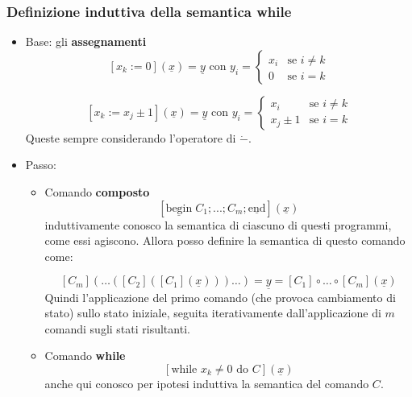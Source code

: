 \documentclass{article}
\begin{document}
\subsubsection{Definizione induttiva della semantica while}
\begin{itemize}
    \item Base: gli \textbf{assegnamenti}
          \[
              [x_k:=0](\underline{x})=\underline{y}\text{ con }y_i=
              \begin{cases}
                  x_i & \text{se }i\neq k \\
                  0   & \text{se }i=k
              \end{cases}
          \]

          \[
              [x_k:=x_j \pm 1](\underline{x})=\underline{y}\text{ con }y_i=
              \begin{cases}
                  x_i       & \text{se } i\neq k \\
                  x_j \pm 1 & \text{se } i=k
              \end{cases}
          \]
Queste sempre considerando l'operatore di $\dot{-}$.
    \item Passo:
          \begin{itemize}
              \item Comando \textbf{composto}
                    $$[\underline{\text{begin}}\;C_1;...;C_m;\underline{\text{end}}](\underline{x})$$
                    induttivamente conosco la semantica di ciascuno di questi programmi, come essi agiscono.
                    Allora posso definire la semantica di questo comando come:

                    $$[C_m](\dots([C_2]([C_1](\underline{x})))\dots)=\underline{y}=[C_1]\circ \dots\circ [C_m](\underline{x})$$
                    Quindi l'applicazione del primo comando (che provoca cambiamento di stato)
                    sullo stato iniziale, seguita iterativamente dall'applicazione di $m$ comandi
                    sugli stati risultanti.

              \item Comando \textbf{while}
                    $$[\text{while }x_k\neq 0 \text{ do }C](\underline{x})$$
                    anche qui conosco per ipotesi induttiva la semantica del comando $C$.


\end{itemize}
\end{itemize}
\end{document}
